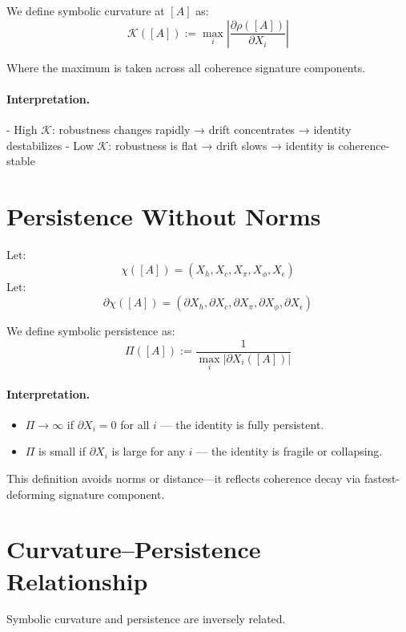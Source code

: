 We define symbolic curvature at $[A]$ as:
\begin{equation} \label{eq:symbolic-curvature}
\mathcal{K}([A]) := \max_i \left| \frac{\partial \rho([A])}{\partial X_i} \right|
\end{equation}

Where the maximum is taken across all coherence signature components.

\paragraph{Interpretation.}
- High $\mathcal{K}$: robustness changes rapidly → drift concentrates → identity destabilizes
- Low $\mathcal{K}$: robustness is flat → drift slows → identity is coherence-stable

\section{Persistence Without Norms}

Let:
\[
\chi([A]) = (X_h, X_c, X_\pi, X_\phi, X_\epsilon)
\]
Let:
\[
\partial\chi([A]) = (\partial X_h, \partial X_c, \partial X_\pi, \partial X_\phi, \partial X_\epsilon)
\]

We define symbolic persistence as:
\begin{equation} \label{eq:persistence}
\Pi([A]) := \frac{1}{\max_i |\partial X_i([A])|}
\end{equation}

\paragraph{Interpretation.}
\begin{itemize}
    \item $\Pi \to \infty$ if $\partial X_i = 0$ for all $i$ — the identity is fully persistent.
    \item $\Pi$ is small if $\partial X_i$ is large for any $i$ — the identity is fragile or collapsing.
\end{itemize}

This definition avoids norms or distance—it reflects coherence decay via fastest-deforming signature component.

\section{Curvature–Persistence Relationship}

Symbolic curvature and persistence are inversely related.

